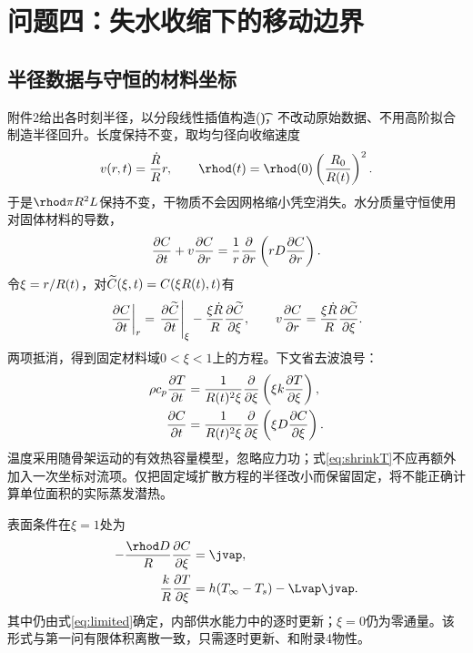 \section{问题四：失水收缩下的移动边界}
\subsection{半径数据与守恒的材料坐标}
附件2给出各时刻半径，以分段线性插值构造\R(\t)，不改动原始数据、不用高阶拟合制造半径回升。长度保持不变，取均匀径向收缩速度
\begin{equation}
v(\rpos,\t)=\frac{\dot\R}{\R}\rpos,\qquad
\rhod(\t)=\rhod(0)\left(\frac{\Rzero}{\R(\t)}\right)^2.\label{eq:shrink}
\end{equation}
于是$\rhod\pi\R^2\Llen$保持不变，干物质不会因网格缩小凭空消失。水分质量守恒使用对固体材料的导数，
\begin{equation}
\frac{\partial C}{\partial t}+v\frac{\partial C}{\partial r}
=\frac{1}{r}\frac{\partial}{\partial r}
\left(rD\frac{\partial C}{\partial r}\right).
\end{equation}
令$\xi=r/R(t)$，对$\widetilde{C}(\xi,t)=C(\xi R(t),t)$有
\begin{equation}
\left.\frac{\partial C}{\partial t}\right|_{r}
=\left.\frac{\partial\widetilde{C}}{\partial t}\right|_\xi
-\frac{\xi\dot{R}}{R}\frac{\partial\widetilde{C}}{\partial\xi},\qquad
v\frac{\partial C}{\partial r}
=\frac{\xi\dot{R}}{R}\frac{\partial\widetilde{C}}{\partial\xi}.
\end{equation}
两项抵消，得到固定材料域$0<\xi<1$上的方程。下文省去波浪号：
\begin{align}
\rho c_p\frac{\partial T}{\partial t}
 &=\frac{1}{R(t)^2\xi}\frac{\partial}{\partial\xi}
 \left(\xi k\frac{\partial T}{\partial\xi}\right),\label{eq:shrinkT}\\
\frac{\partial C}{\partial t}
 &=\frac{1}{R(t)^2\xi}\frac{\partial}{\partial\xi}
 \left(\xi D\frac{\partial C}{\partial\xi}\right).\label{eq:shrinkC}
\end{align}
温度采用随骨架运动的有效热容量模型，忽略应力功；式\eqref{eq:shrinkT}不应再额外加入一次坐标对流项。仅把固定域扩散方程的半径改小而保留固定\rhod，将不能正确计算单位面积的实际蒸发潜热。

表面条件在$\xi=1$处为
\begin{align}
-\frac{\rhod\Ddiff}{\R}\frac{\partial\C}{\partial\xi}
 &=\jvap,\\
\frac{\kcond}{\R}\frac{\partial\T}{\partial\xi}
 &=\hconv(\Tinf-\T_s)-\Lvap\jvap.
\end{align}
其中\jvap{}仍由式\eqref{eq:limited}确定，内部供水能力中的\rhod{}逐时更新；$\xi=0$仍为零通量。该形式与第一问有限体积离散一致，只需逐时更新\R、\rhod{}和附录4物性。

